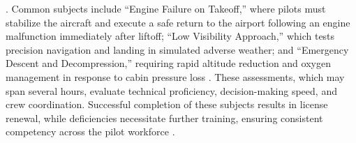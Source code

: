 \documentclass[opre,sglanonrev]{informs4}
\begin{document}
\citep{NTSB2012}. Common subjects include ``Engine Failure on Takeoff,'' where pilots must stabilize the aircraft and execute a safe return to the airport following an engine malfunction immediately after liftoff; ``Low Visibility Approach,'' which tests precision navigation and landing in simulated adverse weather; and ``Emergency Descent and Decompression,'' requiring rapid altitude reduction and oxygen management in response to cabin pressure loss \citep{PilotWorkshops2023}. These assessments, which may span several hours, evaluate technical proficiency, decision-making speed, and crew coordination. Successful completion of these subjects results in license renewal, while deficiencies necessitate further training, ensuring consistent competency across the pilot workforce \citep{EASA2020}.

\end{document}
